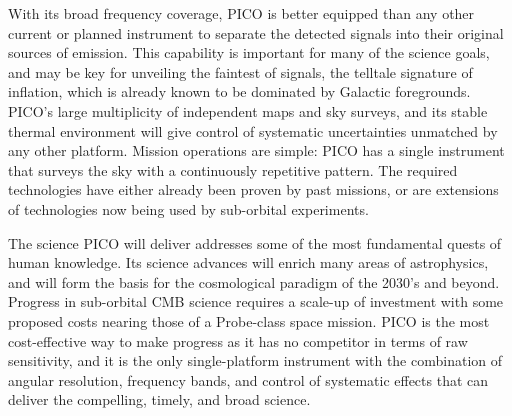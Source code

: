 \documentclass[PICOAPC.tex]{subfiles}
\begin{document}
With its broad frequency coverage, PICO is better equipped than any other current or planned instrument to separate the detected signals into their original sources of emission.  This capability is important for many of the science goals, and may be key for unveiling the faintest of signals, the telltale signature of inflation, which is already known to be dominated by Galactic foregrounds. 
PICO's large multiplicity of independent maps and sky surveys, and its stable thermal environment will give control of systematic uncertainties unmatched by any other platform. 
Mission operations are simple: PICO has a single instrument that surveys the sky with a continuously repetitive pattern.  
The required technologies have either already been proven by past missions, or are extensions of technologies now being used by sub-orbital experiments.  

The science PICO will deliver addresses some of the most fundamental quests of human knowledge. Its science advances will enrich many areas of astrophysics, and will form the basis for the cosmological paradigm of the 2030's and beyond. 
Progress in sub-orbital CMB science requires a scale-up of investment with some proposed costs nearing those of a Probe-class space mission. 
PICO is the most cost-effective way to make progress as it has no competitor in terms of raw sensitivity, and it is the only single-platform instrument with the combination of angular resolution, frequency bands, and control of systematic effects that can deliver the compelling, timely, and broad science. 


\end{document}
